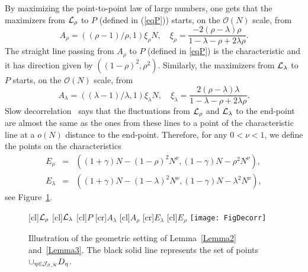 \documentclass[12pt,a4paper]{article}
\numberwithin{equation}{section}
\newcommand{\Or}{\mathcal{O}}
\begin{document}
By maximizing the point-to-point law of large numbers, one gets that the maximizers from ${\cal L}_\rho$ to $P$ (defined in (\ref{eqP})) starts, on the $\Or(N)$ scale, from
\begin{equation}\label{eqA}
A_\rho=((\rho-1)/\rho,1)\xi_\rho N,\quad \xi_\rho=\frac{-2(\rho-\lambda)\rho}{1-\lambda-\rho+2\lambda\rho}.
\end{equation}
The straight line passing from $A_\rho$ to $P$ (defined in \eqref{eqP}) is the characteristic and it has direction given by $((1-\rho)^2,\rho^2)$. Similarly, the maximizers from ${\cal L}_\lambda$ to $P$ starts, on the $\Or(N)$ scale, from
\begin{equation}\label{eqB}
A_\lambda=((\lambda-1)/\lambda,1)\xi_\lambda N,\quad \xi_\lambda=\frac{2(\rho-\lambda)\lambda}{1-\lambda-\rho+2\lambda\rho}.
\end{equation}
Slow decorrelation~\cite{Fer08,CFP10b} says that the fluctuations from ${\cal L}_\rho$ and ${\cal L}_\lambda$ to the end-point are almost the same as the ones from these lines to a point of the characteristic line at a $o(N)$ distance to the end-point. Therefore, for any $0<\nu<1$, we define the points on the characteristics
\begin{eqnarray}
E_\rho &=&((1+\gamma) N-(1-\rho)^2 N^{\nu}, (1-\gamma)N-\rho^2 N^\nu),\\
E_\lambda &= &((1+\gamma) N- (1-\lambda)^2 N^{\nu}, (1-\gamma)N-\lambda^2 N^\nu),
\end{eqnarray}
see Figure~\ref{FigDecorr}.
%
\begin{figure}
\begin{center}
[cl]{${\cal L}_\rho$}
[cl]{${\cal L}_\lambda$}
[cl]{$P$}
[cr]{$A_\lambda$}
[cl]{$A_\rho$}
[cr]{$E_\lambda$}
[cl]{$E_\rho$}
\texttt{[image: FigDecorr]}
\caption{Illustration of the geometric setting of Lemma~\ref{Lemma2} and~\ref{Lemma3}. The black solid line represents the set of points $\cup_{\eta\in {\cal J}_{\beta,N}} D_\eta$.}
\label{FigDecorr}
\end{center}
\end{figure}
%
\end{document}
